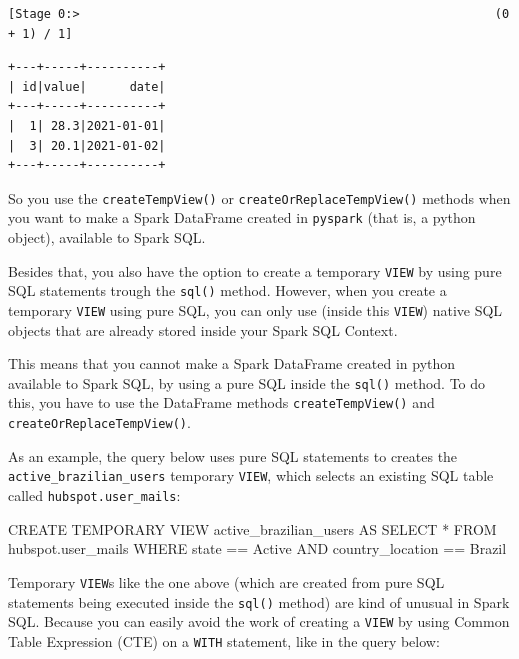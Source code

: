 \documentclass[
  11pt,
  letterpaper,
  DIV=11,
  numbers=noendperiod]{scrreprt}
\newenvironment{Shaded}{\begin{snugshade}}{\end{snugshade}}
\newcommand{\KeywordTok}[1]{\textcolor[rgb]{0.00,0.23,0.31}{#1}}
\newcommand{\NormalTok}[1]{\textcolor[rgb]{0.00,0.23,0.31}{#1}}
\newcommand{\OperatorTok}[1]{\textcolor[rgb]{0.37,0.37,0.37}{#1}}
\newcommand{\StringTok}[1]{\textcolor[rgb]{0.13,0.47,0.30}{#1}}
\begin{document}
\begin{verbatim}
[Stage 0:>                                                          (0 + 1) / 1]
\end{verbatim}

\begin{verbatim}
+---+-----+----------+
| id|value|      date|
+---+-----+----------+
|  1| 28.3|2021-01-01|
|  3| 20.1|2021-01-02|
+---+-----+----------+
\end{verbatim}

So you use the \texttt{createTempView()} or
\texttt{createOrReplaceTempView()} methods when you want to make a Spark
DataFrame created in \texttt{pyspark} (that is, a python object),
available to Spark SQL.

Besides that, you also have the option to create a temporary
\texttt{VIEW} by using pure SQL statements trough the \texttt{sql()}
method. However, when you create a temporary \texttt{VIEW} using pure
SQL, you can only use (inside this \texttt{VIEW}) native SQL objects
that are already stored inside your Spark SQL Context.

This means that you cannot make a Spark DataFrame created in python
available to Spark SQL, by using a pure SQL inside the \texttt{sql()}
method. To do this, you have to use the DataFrame methods
\texttt{createTempView()} and \texttt{createOrReplaceTempView()}.

As an example, the query below uses pure SQL statements to creates the
\texttt{active\_brazilian\_users} temporary \texttt{VIEW}, which selects
an existing SQL table called \texttt{hubspot.user\_mails}:

\begin{Shaded}
\begin{Highlighting}[]
\KeywordTok{CREATE} \KeywordTok{TEMPORARY} \KeywordTok{VIEW}\NormalTok{ active\_brazilian\_users }\KeywordTok{AS}
\KeywordTok{SELECT} \OperatorTok{*}
\KeywordTok{FROM}\NormalTok{ hubspot.user\_mails}
\KeywordTok{WHERE}\NormalTok{ state }\OperatorTok{==} \StringTok{\textquotesingle{}Active\textquotesingle{}}
\KeywordTok{AND}\NormalTok{ country\_location }\OperatorTok{==} \StringTok{\textquotesingle{}Brazil\textquotesingle{}}
\end{Highlighting}
\end{Shaded}

Temporary \texttt{VIEW}s like the one above (which are created from pure
SQL statements being executed inside the \texttt{sql()} method) are kind
of unusual in Spark SQL. Because you can easily avoid the work of
creating a \texttt{VIEW} by using Common Table Expression (CTE) on a
\texttt{WITH} statement, like in the query below:
\end{document}
